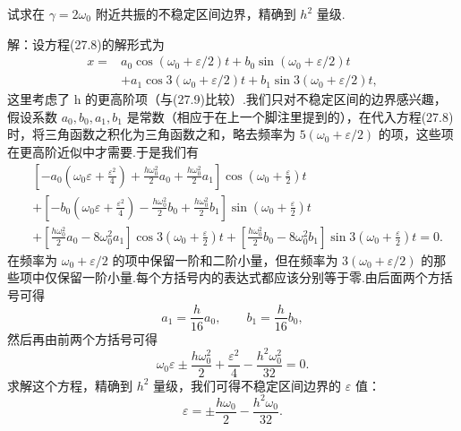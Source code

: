 \begin{xiti}

\quad 试求在 $\gamma=2\omega_0$ 附近共振的不稳定区间边界，精确到 $h^2$ 量级.

解：设方程(27.8)的解形式为
\begin{equation*}
\begin{aligned}
  x={}&a_0\cos\left(\omega_0+\varepsilon/2\right)t
  +b_0\sin\left(\omega_0+\varepsilon/2\right)t\\
  &+a_1\cos 3\left(\omega_0+\varepsilon/2\right)t
  +b_1\sin 3\left(\omega_0+\varepsilon/2\right)t,
\end{aligned}
\end{equation*}
这里考虑了 h 的更高阶项（与(27.9)比较）.我们只对不稳定区间的边界感兴趣，假设系数 $a_0,b_0,a_1,b_1$ 是常数（相应于在上一个脚注里提到的），在代入方程(27.8)时，将三角函数之积化为三角函数之和，略去频率为 $5\left(\omega_0+\varepsilon/2\right)$ 的项，这些项在更高阶近似中才需要.于是我们有
\begin{equation*}
\begin{aligned}
  &\left[-a_0\left(\omega_0\varepsilon+\frac{\varepsilon^2}{4}\right)
  +\frac{h\omega_0^2}{2}a_0+\frac{h\omega_0^2}{2}a_1\right]
  \cos\left(\omega_0+\frac{\varepsilon}{2}\right)t\\
  &+\left[-b_0\left(\omega_0\varepsilon+\frac{\varepsilon^2}{4}\right)
  -\frac{h\omega_0^2}{2}b_0+\frac{h\omega_0^2}{2}b_1\right]
  \sin\left(\omega_0+\frac{\varepsilon}{2}\right)t\\
  &+\left[\frac{h\omega_0^2}{2}a_0-8\omega_0^2a_1\right]
  \cos 3\left(\omega_0+\frac{\varepsilon}{2}\right)t
  +\left[\frac{h\omega_0^2}{2}b_0-8\omega_0^2b_1\right]
  \sin 3\left(\omega_0+\frac{\varepsilon}{2}\right)t=0.
\end{aligned}
\end{equation*}
在频率为 $\omega_0+\varepsilon/2$ 的项中保留一阶和二阶小量，但在频率为 $3\left(\omega_0+\varepsilon/2\right)$ 的那些项中仅保留一阶小量.每个方括号内的表达式都应该分别等于零.由后面两个方括号可得
\begin{equation*}
  a_1=\frac{h}{16}a_0,\qquad
  b_1=\frac{h}{16}b_0,
\end{equation*}
然后再由前两个方括号可得
\begin{equation*}
  \omega_0\varepsilon\pm\frac{h\omega_0^2}{2}
  +\frac{\varepsilon^2}{4}-\frac{h^2\omega_0^2}{32}=0.
\end{equation*}
求解这个方程，精确到 $h^2$ 量级，我们可得不稳定区间边界的 $\varepsilon$ 值：
\begin{equation*}
  \varepsilon=\pm\frac{h\omega_0}{2}-\frac{h^2\omega_0}{32}.
\end{equation*}


\end{xiti}
